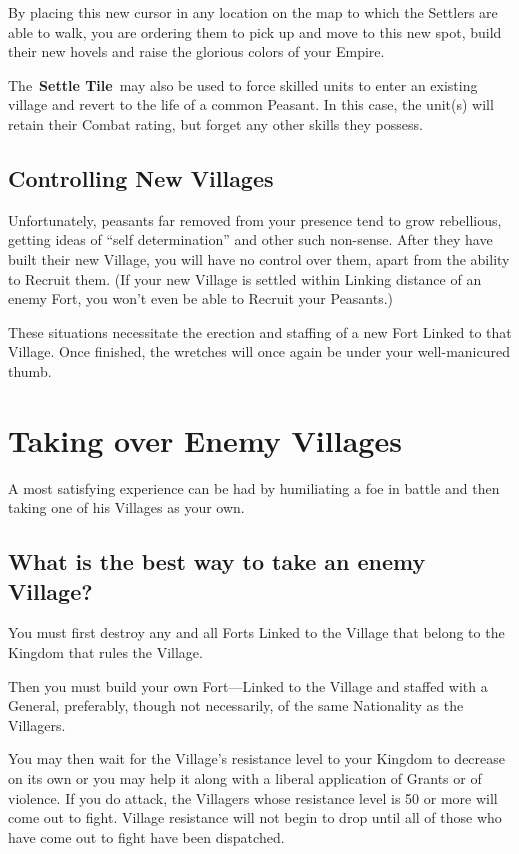 By placing this new cursor in any location on the map to which the Settlers are able to walk, you are ordering them to pick up and move to this new spot, build their new hovels and raise the glorious colors of your Empire.

The \textbf{Settle Tile} may also be used to force skilled units to enter an existing village and revert to the life of a common Peasant. In this case, the unit(s) will retain their Combat rating, but forget any other skills they possess.

\subsection{Controlling New Villages}

Unfortunately, peasants far removed from your presence tend to grow rebellious, getting ideas of “self determination” and other such non-sense. After they have built their new Village, you will have no control over them, apart from the ability to Recruit them. (If your new Village is settled within Linking distance of an enemy Fort, you won’t even be able to Recruit your Peasants.)

These situations necessitate the erection and staffing of a new Fort Linked to that Village. Once finished, the wretches will once again be under your well-manicured thumb.

\section{Taking over Enemy Villages}

A most satisfying experience can be had by humiliating a foe in battle and then taking one of his Villages as your own.

\subsection{What is the best way to take an enemy Village?}

You must first destroy any and all Forts Linked to the Village that belong to the Kingdom that rules the Village.

Then you must build your own Fort---Linked to the Village and staffed with a General, preferably, though not necessarily, of the same Nationality as the Villagers.

You may then wait for the Village’s resistance level to your Kingdom to decrease on its own or you may help it along with a liberal application of Grants or of violence. If you do attack, the Villagers whose resistance level is 50 or more will come out to fight. Village resistance will not begin to drop until all of those who have come out to fight have been dispatched.

